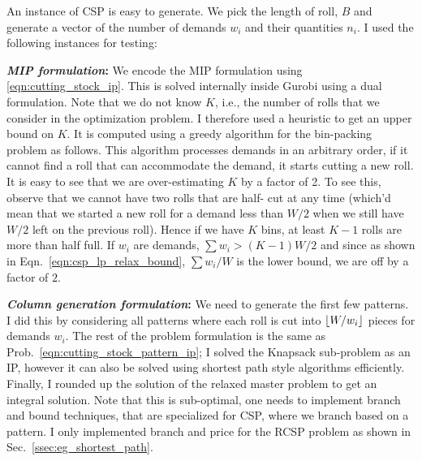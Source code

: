 \documentclass[letterpaper, 10pt, twocolumn, reqno]{amsart}
\begin{document}
An instance of CSP is easy to generate. We pick the length of roll, $B$ and generate a vector of the number of demands $w_i$ and their quantities $n_i$. I used the following instances for testing:

\textbf{\emph{MIP formulation}:} We encode the MIP formulation using \eqref{eqn:cutting_stock_ip}. This is solved internally inside Gurobi using a dual formulation. Note that we do not know $K$, i.e., the number of rolls that we
consider in the optimization problem. I therefore used a heuristic to get an upper bound on $K$. It is computed using a greedy algorithm for the bin-packing problem as follows. This algorithm processes demands in an arbitrary
order, if it cannot find a roll that can accommodate the demand, it starts
cutting a new roll. It is easy to see that we are over-estimating $K$ by a factor of 2. To see this, observe that we cannot have two rolls that are half-
cut at any time (which'd mean that we started a new roll for a demand less than $W/2$ when we still have $W/2$ left on the previous roll). Hence if we
have $K$ bins, at least $K-1$ rolls are more than half full. If $w_i$ are demands, $\sum w_i > (K-1) W/2$ and since as shown in Eqn.~\eqref{eqn:csp_lp_relax_bound}, $\sum w_i/W$ is the lower bound, we are off by a factor of $2$.

\textbf{\emph{Column generation formulation}:} We need to generate the first few patterns. I did this by considering all patterns where each roll is cut into $\lfloor W/w_i\rfloor$ pieces for demands $w_i$. The rest of the problem formulation is the same as Prob.~\ref{eqn:cutting_stock_pattern_ip}; I solved the Knapsack sub-problem as an IP, however it can also be solved using shortest path style algorithms efficiently. Finally, I rounded up the solution of the relaxed master problem to get an integral solution. Note that this is sub-optimal, one needs to implement branch and bound techniques, that are specialized for CSP, where we branch based on a pattern. I only implemented branch and price for the RCSP problem as shown in Sec.~\ref{ssec:eg_shortest_path}.
\end{document}
